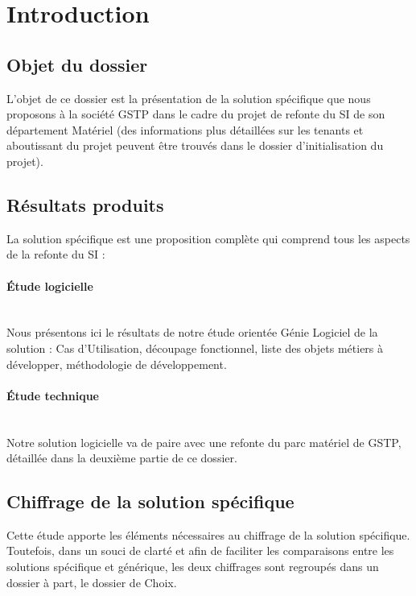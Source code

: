 \section{Introduction}


\subsection{Objet du dossier}

L'objet de ce dossier est la présentation de la solution spécifique que
nous proposons à la société GSTP dans le cadre du projet de refonte du SI
de son département Matériel (des informations plus détaillées sur les
tenants et aboutissant du projet peuvent être trouvés dans le dossier
d'initialisation du projet).


\subsection{Résultats produits}

La solution spécifique est une proposition complète qui comprend tous les
aspects de la refonte du SI :

\paragraph{Étude logicielle}\hfill\\
Nous présentons ici le résultats de notre étude orientée Génie Logiciel de
la solution : Cas d'Utilisation, découpage fonctionnel, liste des objets
métiers à développer, méthodologie de développement.

\paragraph{Étude technique}\hfill\\
Notre solution logicielle va de paire avec une refonte du parc matériel de
GSTP, détaillée dans la deuxième partie de ce dossier.


\subsection{Chiffrage de la solution spécifique}

Cette étude apporte les éléments nécessaires au chiffrage de la solution
spécifique. Toutefois, dans un souci de clarté et afin de faciliter les
comparaisons entre les solutions spécifique et générique, les deux
chiffrages sont regroupés dans un dossier à part, le dossier de Choix.
